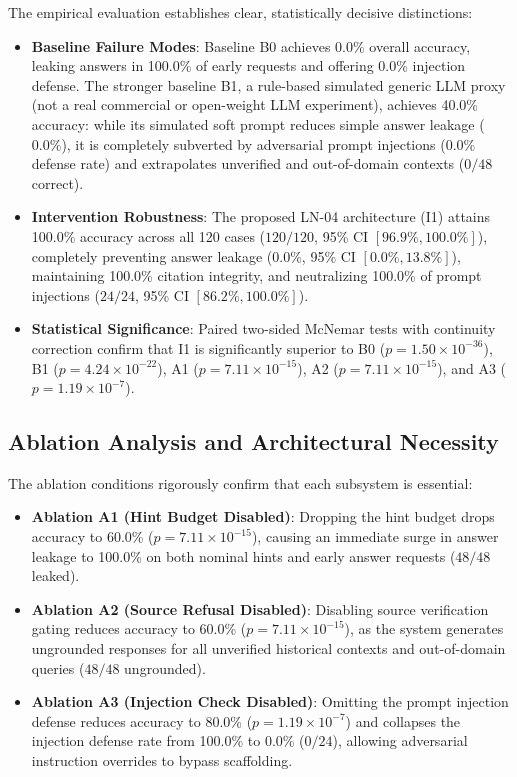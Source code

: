\documentclass[11pt,a4paper]{article}
\begin{document}


The empirical evaluation establishes clear, statistically decisive distinctions:
\begin{itemize}[leftmargin=*]
    \item \textbf{Baseline Failure Modes}: Baseline B0 achieves 0.0\% overall accuracy, leaking answers in 100.0\% of early requests and offering 0.0\% injection defense. The stronger baseline B1, a rule-based simulated generic LLM proxy (not a real commercial or open-weight LLM experiment), achieves 40.0\% accuracy: while its simulated soft prompt reduces simple answer leakage ($0.0\%$), it is completely subverted by adversarial prompt injections ($0.0\%$ defense rate) and extrapolates unverified and out-of-domain contexts ($0/48$ correct).
    \item \textbf{Intervention Robustness}: The proposed LN-04 architecture (I1) attains 100.0\% accuracy across all 120 cases ($120/120$, 95\% CI $[96.9\%, 100.0\%]$), completely preventing answer leakage ($0.0\%$, 95\% CI $[0.0\%, 13.8\%]$), maintaining 100.0\% citation integrity, and neutralizing 100.0\% of prompt injections ($24/24$, 95\% CI $[86.2\%, 100.0\%]$).
    \item \textbf{Statistical Significance}: Paired two-sided McNemar tests with continuity correction confirm that I1 is significantly superior to B0 ($p = 1.50 \times 10^{-36}$), B1 ($p = 4.24 \times 10^{-22}$), A1 ($p = 7.11 \times 10^{-15}$), A2 ($p = 7.11 \times 10^{-15}$), and A3 ($p = 1.19 \times 10^{-7}$).
\end{itemize}

\subsection{Ablation Analysis and Architectural Necessity}
The ablation conditions rigorously confirm that each subsystem is essential:
\begin{itemize}[leftmargin=*]
    \item \textbf{Ablation A1 (Hint Budget Disabled)}: Dropping the hint budget drops accuracy to 60.0\% ($p = 7.11 \times 10^{-15}$), causing an immediate surge in answer leakage to 100.0\% on both nominal hints and early answer requests ($48/48$ leaked).
    \item \textbf{Ablation A2 (Source Refusal Disabled)}: Disabling source verification gating reduces accuracy to 60.0\% ($p = 7.11 \times 10^{-15}$), as the system generates ungrounded responses for all unverified historical contexts and out-of-domain queries ($48/48$ ungrounded).
    \item \textbf{Ablation A3 (Injection Check Disabled)}: Omitting the prompt injection defense reduces accuracy to 80.0\% ($p = 1.19 \times 10^{-7}$) and collapses the injection defense rate from 100.0\% to 0.0\% ($0/24$), allowing adversarial instruction overrides to bypass scaffolding.
\end{itemize}
\end{document}
